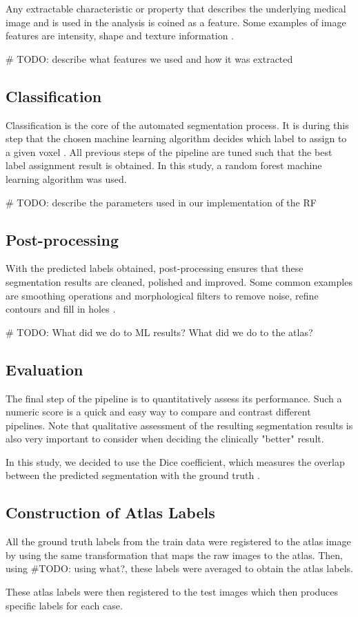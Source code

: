 Any extractable characteristic or property that describes the underlying medical image and is used in the analysis is coined as a feature. Some examples of image features are intensity, shape and texture information \cite{b8}.

\# TODO: describe what features we used and how it was extracted

\subsection{Classification}

Classification is the core of the automated segmentation process. It is during this step that the chosen machine learning algorithm decides which label to assign to a given voxel \cite{b8}. All previous steps of the pipeline are tuned such that the best label assignment result is obtained. In this study, a random forest machine learning algorithm was used.

\# TODO: describe the parameters used in our implementation of the RF

\subsection{Post-processing}

With the predicted labels obtained, post-processing ensures that these segmentation results are cleaned, polished and improved. Some common examples are smoothing operations and morphological filters to remove noise, refine contours and fill in holes \cite{b11}.

\# TODO: What did we do to ML results? What did we do to the atlas?

\subsection{Evaluation}

The final step of the pipeline is to quantitatively assess its performance. Such a numeric score is a quick and easy way to compare and contrast different pipelines. Note that qualitative assessment of the resulting segmentation results is also very important to consider when deciding the clinically "better" result.

In this study, we decided to use the Dice coefficient, which measures the overlap between the predicted segmentation with the ground truth \cite{b12}.

\subsection{Construction of Atlas Labels}

All the ground truth labels from the train data were registered to the atlas image by using the same transformation that maps the raw images to the atlas. Then, using \#TODO: using what?, these labels were averaged to obtain the atlas labels.

These atlas labels were then registered to the test images which then produces specific labels for each case.




